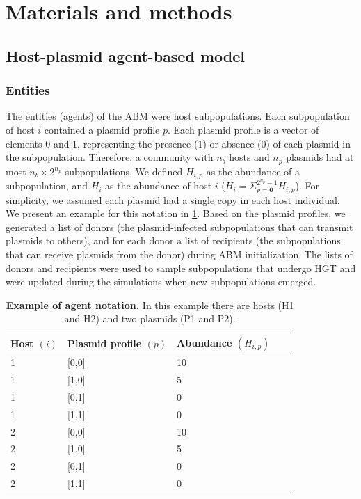 \documentclass[10pt,letterpaper]{article}
\begin{document}
\section*{Materials and methods}
\subsection*{Host-plasmid agent-based model}
\subsubsection*{Entities} The entities (agents) of the ABM were host subpopulations. Each subpopulation of host $i$ contained a plasmid profile $p$. Each plasmid profile is a vector of elements 0 and 1, representing the presence (1) or absence (0) of each plasmid in the subpopulation. Therefore, a community with $n_b$ hosts and $n_p$ plasmids had at most $n_b \times 2^{n_p}$ subpopulations. We defined $H_{i,p}$ as the abundance of a subpopulation, and $H_i$ as the abundance of host $i$ ($H_i=\Sigma_{p=\mathbf{0}}^{2^{n_p}-1}H_{i,p}$). For simplicity, we assumed each plasmid had a single copy in each host individual. We present an example for this notation in \cref{tab: tab1}. Based on the plasmid profiles, we generated a list of donors (the plasmid-infected subpopulations that can transmit plasmids to others), and for each donor a list of recipients (the subpopulations that can receive plasmids from the donor) during ABM initialization. The lists of donors and recipients were used to sample subpopulations that undergo HGT and were updated during the simulations when new subpopulations emerged.

\begin{table}[!ht]
\centering\captionsetup{font=footnotesize}
\begin{center}
 \caption{\textbf{Example of agent notation.} In this example there are hosts (H1 and H2) and two plasmids (P1 and P2).}\label{tab: tab1}
 \begin{tabular}{@{}lllll@{}}
 \toprule
Host $(i)$ & Plasmid profile $(p)$ & Abundance $(H_{i,p})$\\
 \midrule
    1  & [0,0] & 10 \\
    1  & [1,0] & 5 \\
    1  & [0,1] & 0 \\
    1  & [1,1] & 0 \\
    2  & [0,0] & 10 \\
    2  & [1,0] & 5 \\
    2  & [0,1] & 0 \\
    2  & [1,1] & 0 \\
 \bottomrule
\end{tabular}
\end{center}
\end{table}
\end{document}
